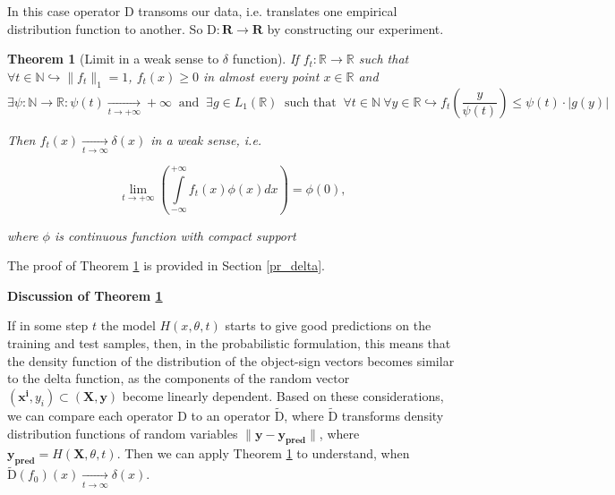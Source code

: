 \documentclass{article}
\newtheorem{theorem}{Theorem}
\begin{document}
    In this case operator $\text{D}$ transoms our data, i.e. translates one empirical distribution function to another. So $\text{D} : \mathbf{R} \to \mathbf{R}$ by constructing our experiment.

    \begin{theorem}[Limit in a weak sense to $\delta$ function] \label{delta}
        If $f_t : \mathbb{R} \to \mathbb{R}$ such that $\forall t \in \mathbb{N} \hookrightarrow  \|f_t\|_1 = 1$, $f_t(x) \geq 0$ in almost every point $x \in \mathbb{R}$ and
        \begin{equation} \label{psi_and_g}
            \exists \psi : \mathbb{N} \to \mathbb{R} : \psi(t) \underset{t \to +\infty}{\longrightarrow} +\infty ~\text{ and }~
            \exists g \in L_1(\mathbb{R}) ~\text{ such that }~ \forall t \in \mathbb{N} ~\forall y \in \mathbb{R} \hookrightarrow f_t\left(\dfrac{y}{\psi(t)}\right) \leq \psi(t) \cdot |g(y)|
        \end{equation}

        Then $f_t(x) \underset{t \to \infty}{\longrightarrow} \delta(x)$ in a weak sense, i.e.

        \begin{equation}
            \underset{t \to +\infty}{\lim}\left(\int\limits_{-\infty}^{+\infty} f_t(x) \phi(x) dx\right) = \phi(0),
        \end{equation}

        where $\phi$ is continuous function with compact support
    \end{theorem}

    The proof of Theorem \ref{delta} is provided in Section \ref{pr_delta}.

    \textbf{Discussion of Theorem \ref{delta}}

    If in some step $t$ the model $H(x, \theta, t)$ starts to give good predictions on the training and test samples, then, in the probabilistic formulation, this means that the density function of the distribution of the object-sign vectors becomes similar to the delta function, as the components of the random vector $(\mathbf{x^i}, y_i) \subset (\mathbf{X}, \mathbf{y})$ become linearly dependent. Based on these considerations, we can compare each operator $\text{D}$ to an operator $\widetilde{\text{D}}$, where $\widetilde{\text{D}}$ transforms density distribution functions of random variables $\|\mathbf{y} - \mathbf{y_{\text{pred}}}\|$, where $\mathbf{y_{\text{pred}}} = H(\mathbf{X}, \theta, t)$. Then we can apply Theorem \ref{delta} to understand, when $\widetilde{\text{D}}(f_0)(x) \underset{t \to \infty}{\longrightarrow} \delta(x)$. 
\end{document}
